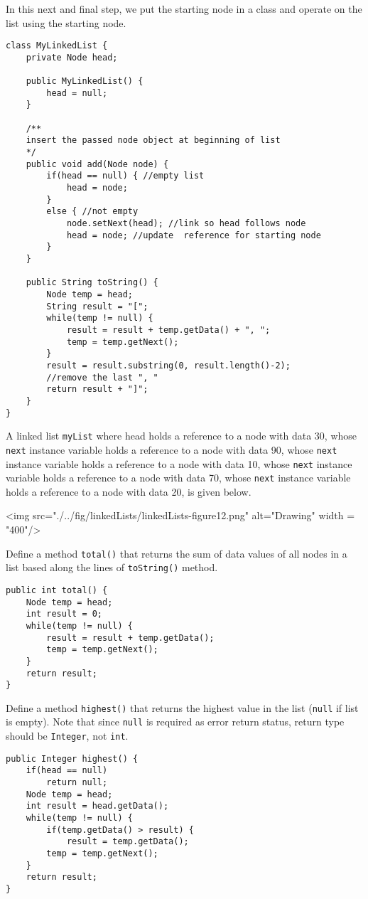 In this next and final step, we put the starting node in a class and operate on the list using the starting node.

\begin{lstlisting}[linewidth=15.5cm]
class MyLinkedList {
	private Node head;
	
	public MyLinkedList() {
		head = null;
	}
	
	/**
	insert the passed node object at beginning of list
	*/
	public void add(Node node) {
		if(head == null) { //empty list
			head = node; 
		}
		else { //not empty
			node.setNext(head); //link so head follows node
			head = node; //update  reference for starting node
		}
	}
	
	public String toString() {
		Node temp = head;
		String result = "[";
		while(temp != null) {
			result = result + temp.getData() + ", ";
			temp = temp.getNext();
		}
		result = result.substring(0, result.length()-2); 
		//remove the last ", "
		return result + "]";
	}
}
\end{lstlisting}

A linked list \texttt{myList} where head holds a reference to a node with data 30, whose \texttt{next} instance variable holds a reference to a node with data 90, whose \texttt{next} instance variable holds a reference to a node with data 10, whose \texttt{next} instance variable holds a reference to a node with data 70, whose \texttt{next} instance variable holds a reference to a node with data 20, is given below.

\vskip 0.5cm

<img src="./../fig/linkedLists/linkedLists-figure12.png" alt="Drawing" width = "400"/>

\begin{exercise}[5]
Define a method \texttt{total()} that returns the sum of data values of all nodes in a list based along the lines of \texttt{toString()} method.	
\end{exercise}
\begin{answer}
\begin{lstlisting}
public int total() {
	Node temp = head;
	int result = 0;
	while(temp != null) {
		result = result + temp.getData();
		temp = temp.getNext();
	}
	return result;
}
\end{lstlisting}	
\end{answer}

\begin{exercise}[8]
Define a method \texttt{highest()} that returns the highest value in the list (\texttt{null} if list is empty). Note that since \texttt{null} is required as error return status, return type should be \texttt{Integer}, not \texttt{int}.
\end{exercise}
\begin{answer}
\begin{lstlisting}
public Integer highest() {
	if(head == null)
		return null;
	Node temp = head;
	int result = head.getData();
	while(temp != null) {
		if(temp.getData() > result) {
			result = temp.getData();
		temp = temp.getNext();
	}
	return result;
}
\end{lstlisting}	
\end{answer}

